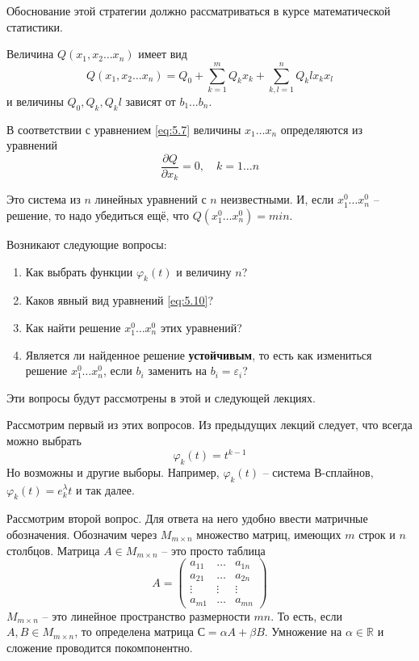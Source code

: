 Обоснование этой стратегии должно рассматриваться в курсе математической статистики.

Величина $Q(x_1, x_2 \dots x_n)$ имеет вид
\begin{equation}
	Q(x_1, x_2 \dots x_n) = Q_0 + \sum_{k=1}^m{Q_k x_k } + \sum_{k, l=1}^n {Q_kl x_k x_l}
\end{equation}
и величины $Q_0, Q_k, Q_kl$ зависят от $b_1 \dots b_n$.


В соответствии с уравнением \ref{eq:5.7} величины  $x_1 \dots x_n$ определяются из уравнений
\begin{equation} \label{eq:5.10}
	 \frac{\partial Q}{\partial x_k } = 0, \quad k = 1 \dots n
\end{equation}

Это система из $n$ линейных уравнений с $n$ неизвестными. И, если $x_1^0 \dots x_n^0$ -- решение, то надо убедиться ещё, что $Q(x_1^0 \dots x_n^0) = min$.

Возникают следующие вопросы: 
\begin{enumerate}[nolistsep]
	\item Как выбрать функции $\varphi_k (t) $  и величину $n$?
	\item Каков явный вид уравнений \ref{eq:5.10}?
	\item Как найти решение $x_1^0 \dots x_n^0$ этих уравнений?
	\item Является ли найденное решение \textbf{устойчивым}, то есть как измениться решение $x_1^0 \dots x_n^0$, если $b_i$ заменить на  $b_i = \varepsilon_i $?
\end{enumerate}

Эти вопросы будут рассмотрены в этой и следующей лекциях.

Рассмотрим первый из этих вопросов.
Из предыдущих лекций следует, что всегда можно выбрать 
\begin{equation}
	\varphi_k(t) = t^{k-1}
\end{equation}
Но возможны и другие выборы. Например, $\varphi_k(t)$ -- система В-сплайнов, $\varphi_k(t) = e^\lambda_k t$ и так далее.

Рассмотрим второй вопрос. Для ответа на него удобно ввести матричные обозначения. Обозначим через $M_{m \times n}$ множество матриц, имеющих $m$ строк и $n$ столбцов. Матрица $A \in M_{m \times n}$ -- это просто таблица
\begin{equation}\label{eq:5.12}
	A =
	\begin{pmatrix}
	a_{11} & \dots & a_{1n}\\
	a_{21} & \dots & a_{2n}\\
	\vdots & \vdots & \vdots \\
	a_{m1} & \dots & a_{mn}
	\end{pmatrix}
\end{equation}
$M_{m \times n}$ -- это линейное пространство размерности $mn$. То есть, если $A,B \in M_{m \times n}$, то определена матрица $С = \alpha A + \beta B$. Умножение на $\alpha \in \mathbb{R}$ и сложение проводится покомпонентно.

